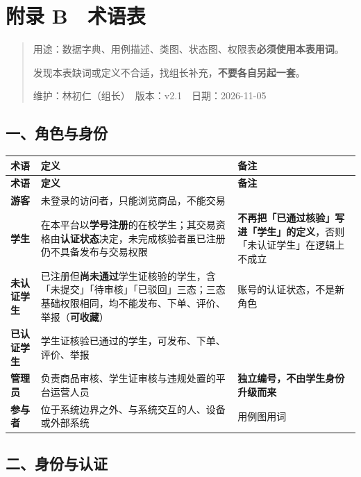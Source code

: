 \documentclass[12pt,a4paper]{ctexart}
\begin{document}
\section*{附录 B　术语表}

\begin{quote}\small
用途：数据字典、用例描述、类图、状态图、权限表\textbf{必须使用本表用词}。

发现本表缺词或定义不合适，找组长补充，\textbf{不要各自另起一套}。

维护：林初仁（组长）　版本：v2.1　日期：2026-11-05

\end{quote}


\subsection*{一、角色与身份}

{\footnotesize
\begin{longtable}{|p{1.54cm}|p{8.71cm}|p{5.76cm}|}
\hline
\textbf{术语} & \textbf{定义} & \textbf{备注} \\
\hline
\endfirsthead
\hline
\textbf{术语} & \textbf{定义} & \textbf{备注} \\
\hline
\endhead
\hline
\endfoot
\textbf{游客} & 未登录的访问者，只能浏览商品，不能交易 &  \\
\hline
\textbf{学生} & 在本平台以\textbf{学号注册}的在校学生；其交易资格由\textbf{认证状态}决定，未完成核验者虽已注册仍不具备发布与交易权限 & \textbf{不再把「已通过核验」写进「学生」的定义}，否则「未认证学生」在逻辑上不成立 \\
\hline
\textbf{未认证学生} & 已注册但\textbf{尚未通过}学生证核验的学生，含「未提交」「待审核」「已驳回」三态；三态基础权限相同，均不能发布、下单、评价、举报（\textbf{可收藏}） & 账号的认证状态，不是新角色 \\
\hline
\textbf{已认证学生} & 学生证核验已通过的学生，可发布、下单、评价、举报 &  \\
\hline
\textbf{管理员} & 负责商品审核、学生证审核与违规处置的平台运营人员 & \textbf{独立编号，不由学生身份升级而来} \\
\hline
\textbf{参与者} & 位于系统边界之外、与系统交互的人、设备或外部系统 & 用例图用词 \\
\hline
\end{longtable}
}


\subsection*{二、身份与认证}
\end{document}
